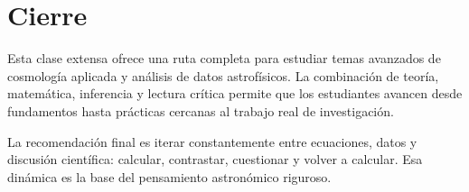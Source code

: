\documentclass[12pt,oneside]{book}
\begin{document}
\chapter{Cierre}

Esta clase extensa ofrece una ruta completa para estudiar temas avanzados de cosmología
aplicada y análisis de datos astrofísicos. La combinación de teoría, matemática,
inferencia y lectura crítica permite que los estudiantes avancen desde fundamentos
hasta prácticas cercanas al trabajo real de investigación.

La recomendación final es iterar constantemente entre ecuaciones, datos y discusión
científica: calcular, contrastar, cuestionar y volver a calcular. Esa dinámica es la
base del pensamiento astronómico riguroso.

\backmatter


\end{document}

